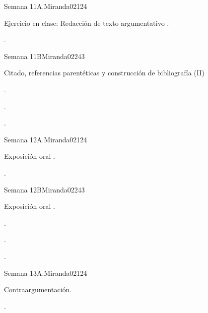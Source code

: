 \begin{syllabus}
\begin{unit}{Semana 11A.}{}{Miranda02}{12}{4}
   \begin{topics}
      \item Ejercicio en clase: Redacción de texto argumentativo .
   \end{topics}
   \begin{learningoutcomes}
      \item . 
   \end{learningoutcomes}
\end{unit}

\begin{unit}{Semana 11B}{}{Miranda02}{24}{3}
   \begin{topics}
      \item Citado, referencias parentéticas y construcción de bibliografía (II)
   \end{topics}

   \begin{learningoutcomes}
      \item . 
      \item .
      \item . 
      \end{learningoutcomes}
\end{unit}

\begin{unit}{Semana 12A.}{}{Miranda02}{12}{4}
   \begin{topics}
      \item Exposición oral .
   \end{topics}
   \begin{learningoutcomes}
      \item . 
   \end{learningoutcomes}
\end{unit}

\begin{unit}{Semana 12B}{}{Miranda02}{24}{3}
   \begin{topics}
      \item Exposición oral .
   \end{topics}

   \begin{learningoutcomes}
      \item . 
      \item .
      \item . 
      \end{learningoutcomes}
\end{unit}

\begin{unit}{Semana 13A.}{}{Miranda02}{12}{4}
   \begin{topics}
      \item Contraargumentación.
   \end{topics}
   \begin{learningoutcomes}
      \item . 
   \end{learningoutcomes}
\end{unit}


\end{syllabus}
